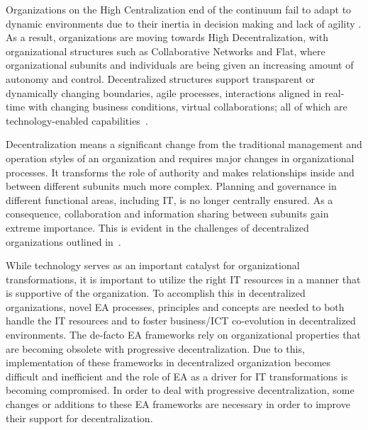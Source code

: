 Organizations on the High Centralization end of the continuum fail to adapt to dynamic environments due to their inertia in decision making and lack of agility \cite{fulk1995,pearlson2009}. As a result, organizations are moving towards High Decentralization, with organizational structures such as Collaborative Networks \cite{Camarinha-Matos2005} and Flat, where organizational subunits and individuals are being given an increasing amount of autonomy and control. Decentralized structures support transparent or dynamically changing boundaries, agile processes, interactions aligned in real-time with changing business conditions, virtual collaborations; all of which are technology-enabled capabilities~\cite{applegate1988,fulk1995}.

Decentralization means a significant change from the traditional management and operation styles of an organization and requires major changes in organizational processes. It transforms the role of authority and makes relationships inside and between different subunits much more complex. Planning and governance in different functional areas, including IT, is no longer centrally ensured. As a consequence, collaboration and information sharing between subunits gain extreme importance. This is evident in the challenges of decentralized organizations outlined in~\cite{caruso2008boundaries}.  


While technology serves as an important catalyst for organizational transformations, it is important to utilize the right IT resources in a manner that is supportive of the organization. To accomplish this in decentralized organizations, novel EA processes, principles and concepts are needed to both handle the IT resources and to foster business/ICT co-evolution in decentralized environments. The de-facto EA frameworks rely on organizational properties that are becoming obsolete with progressive decentralization.  Due to this, implementation of these frameworks in decentralized organization becomes difficult and inefficient and the role of EA as a driver for IT transformations is becoming compromised. In order to deal with progressive decentralization, some changes or additions to these EA frameworks are necessary in order to improve their support for decentralization.




